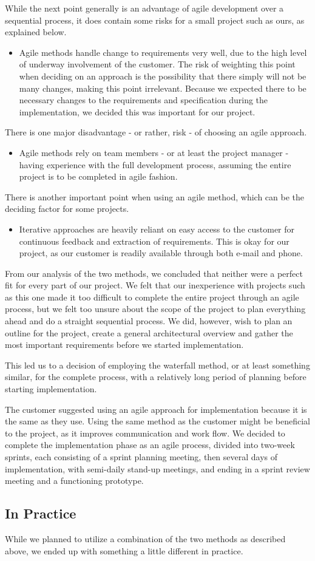 While the next point generally is an advantage of agile development over a sequential process, it does contain some risks for a small project such as ours, as explained below.
	\begin{itemize}
		\item Agile methods handle change to requirements very well, due to the high level of underway involvement of the customer. The risk of weighting this point when deciding on an approach is the possibility that there simply will not be many changes, making this point irrelevant. Because we expected there to be necessary changes to the requirements and specification during the implementation, we decided this was important for our project.
	\end{itemize}
There is one major disadvantage - or rather, risk - of choosing an agile approach.
	\begin{itemize}
		\item Agile methods rely on team members - or at least the project manager - having experience with the full development process, assuming the entire project is to be completed in agile fashion.		
	\end{itemize}
There is another important point when using an agile method, which can be the deciding factor for some projects.
	\begin{itemize}
		\item Iterative approaches are heavily reliant on easy access to the customer for continuous feedback and extraction of requirements. This is okay for our project, as our customer is readily available through both e-mail and phone.
	\end{itemize}

From our analysis of the two methods, we concluded that neither were a perfect fit for every part of our project. We felt that our inexperience with projects such as this one made it too difficult to complete the entire project through an agile process, but we felt too unsure about the scope of the project to plan everything ahead and do a straight sequential process. We did, however, wish to plan an outline for the project, create a general architectural overview and gather the most important requirements before we started implementation.

This led us to a decision of employing the waterfall method, or at least something similar, for the complete process, with a relatively long period of planning before starting implementation.

The customer suggested using an agile approach for implementation because it is the same as they use. Using the same method as the customer might be beneficial to the project, as it improves communication and work flow. We decided to complete the implementation phase as an agile process, divided into two-week sprints, each consisting of a sprint planning meeting, then several days of implementation, with semi-daily stand-up meetings, and ending in a sprint review meeting and a functioning prototype.

\subsection{In Practice}
While we planned to utilize a combination of the two methods as described above, we ended up with something a little different in practice.